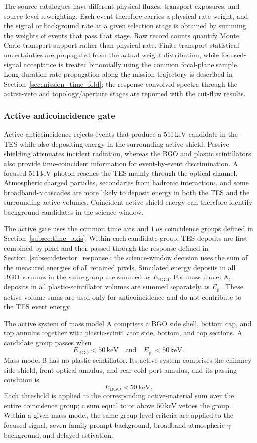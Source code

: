\documentclass[11pt]{article}
\newcommand{\keV}{\ensuremath{\,\mathrm{keV}}}
\begin{document}
The source catalogues have different physical fluxes, transport exposures, and
source-level reweighting. Each event therefore carries a physical-rate weight,
and the signal or background rate at a given selection stage is obtained by
summing the weights of events that pass that stage. Raw record counts quantify
Monte Carlo transport support rather than physical rate. Finite-transport
statistical uncertainties are propagated from the actual weight distribution,
while focused-signal acceptance is treated binomially using the common focal-plane
sample. Long-duration rate propagation along the mission trajectory is described
in Section~\ref{sec:mission_time_fold}; the response-convolved spectra through
the active-veto and topology/aperture stages are reported with the cut-flow results.

\subsubsection{Active anticoincidence gate}

Active anticoincidence rejects events that produce a 511\,keV candidate in the
TES while also depositing energy in the surrounding active shield. Passive
shielding attenuates incident radiation, whereas the BGO and plastic
scintillators also provide time-coincident information for event-by-event
discrimination. A focused 511\,keV photon reaches the TES mainly through the
optical channel. Atmospheric charged particles, secondaries from hadronic
interactions, and some broadband-$\gamma$ cascades are more likely to deposit
energy in both the TES and the surrounding active volumes. Coincident
active-shield energy can therefore identify background candidates in the
science window.

The active gate uses the common time axis and $1\,\mu\mathrm{s}$ coincidence
groups defined in Section~\ref{subsec:time_axis}. Within each candidate group,
TES deposits are first combined by pixel and then passed through the response
defined in Section~\ref{subsec:detector_response}; the science-window decision
uses the sum of the measured energies of all retained pixels. Simulated energy
deposits in all BGO volumes in the same group are summed as
$E_{\mathrm{BGO}}$. For mass model A, deposits in all plastic-scintillator
volumes are summed separately as $E_{\mathrm{pl}}$. These active-volume sums
are used only for anticoincidence and do not contribute to the TES event energy.

The active system of mass model A comprises a BGO side shell, bottom cap, and
top annulus together with plastic-scintillator side, bottom, and top sections.
A candidate group passes when
\[
 E_{\mathrm{BGO}}<50\keV
 \quad\text{and}\quad
 E_{\mathrm{pl}}<50\keV .
\]
Mass model B has no plastic scintillator. Its active system comprises the
chimney side shield, front optical annulus, and rear cold-port annulus, and its
passing condition is
\[
 E_{\mathrm{BGO}}<50\keV .
\]
Each threshold is applied to the corresponding active-material sum over the
entire coincidence group; a sum equal to or above $50\keV$ vetoes the group.
Within a given mass model, the same group-level criteria are applied to the
focused signal, seven-family prompt background, broadband atmospheric
$\gamma$ background, and delayed activation.
\end{document}
